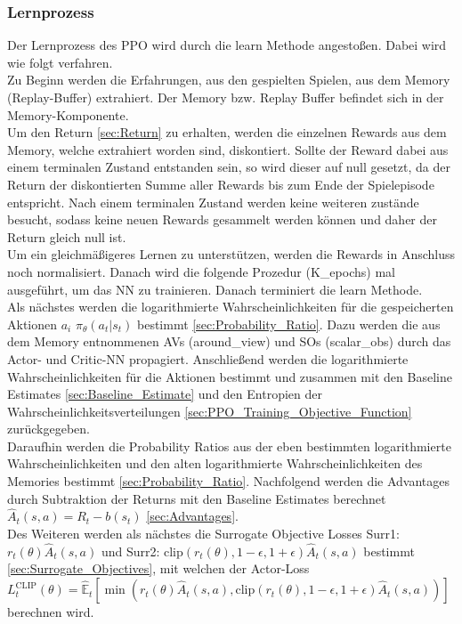 \subsubsection{Lernprozess}
Der Lernprozess des PPO wird durch die learn Methode angestoßen. Dabei wird wie folgt verfahren.\\
Zu Beginn werden die Erfahrungen, aus den gespielten Spielen, aus dem Memory (Replay-Buffer) extrahiert. Der Memory bzw. Replay Buffer befindet sich in der Memory-Komponente.\\
Um den Return \ref{sec:Return} zu erhalten, werden die einzelnen Rewards aus dem Memory, welche extrahiert worden sind, diskontiert. Sollte der Reward dabei aus einem terminalen Zustand entstanden sein, so wird dieser auf null gesetzt, da der Return der diskontierten Summe aller Rewards bis zum Ende der Spielepisode entspricht. Nach einem terminalen Zustand werden keine weiteren zustände besucht, sodass keine neuen Rewards gesammelt werden können und daher der Return gleich null ist.\\
Um ein gleichmäßigeres Lernen zu unterstützen, werden die Rewards in Anschluss noch normalisiert.
Danach wird die folgende Prozedur (K\_epochs) mal ausgeführt, um das NN zu trainieren. Danach terminiert die learn Methode.\\
Als nächstes werden die logarithmierte Wahrscheinlichkeiten für die gespeicherten Aktionen $a_i$ $\pi_{\theta}(a_{t}|s_{t})$ bestimmt \ref{sec:Probability_Ratio}. Dazu werden die aus dem Memory entnommenen AVs (around\_view) und SOs (scalar\_obs) durch das Actor- und Critic-NN propagiert. Anschließend werden die logarithmierte Wahrscheinlichkeiten für die Aktionen bestimmt und zusammen mit den Baseline Estimates \ref{sec:Baseline_Estimate} und den Entropien der Wahrscheinlichkeitsverteilungen \ref{sec:PPO_Training_Objective_Function} zurückgegeben.\\
Daraufhin werden die Probability Ratios aus der eben bestimmten logarithmierte Wahrscheinlichkeiten und den alten logarithmierte Wahrscheinlichkeiten des Memories bestimmt \ref{sec:Probability_Ratio}.
Nachfolgend werden die Advantages durch Subtraktion der Returns mit den Baseline Estimates berechnet $\hat{A}_{t}(s, a) = R_{t} - b(s_{t})$ \ref{sec:Advantages}.\\
Des Weiteren werden als nächstes die Surrogate Objective Losses Surr1: $r_{t}(\theta) \hat{A}_{t}(s, a)$ und Surr2: $\text{clip}(r_{t}(\theta), 1 - \epsilon, 1 + \epsilon) \hat{A}_{t}(s, a)$ bestimmt \ref{sec:Surrogate_Objectives}, mit welchen der Actor-Loss $L^\text{CLIP}_{t} (\theta) = \mathbb{\hat{E}}_{t} [ \min(r_{t}(\theta) \hat{A}_{t}(s, a), \text{clip}(r_{t}(\theta), 1 - \epsilon, 1 + \epsilon) \hat{A}_{t}(s, a))]$ berechnen wird.
